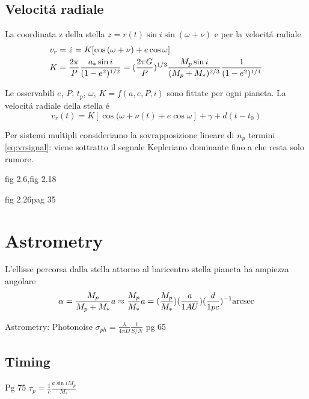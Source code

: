 \subsection{Velocit\'a radiale}
\begin{workout}
La coordinata z della stella $z=r(t)\sin{i}\sin{(\omega+\nu)}$ e per la velocit\'a radiale
\begin{align}
&v_r=\dot{z}=K[\cos{(\omega+\nu)}+e\cos{\omega}]\label{eq:vrsignal}\\
&K=\frac{2\pi}{P}\frac{a_*\sin{i}}{(1-e^2)\expy{1/2}}=(\frac{2\pi G}{P})\expy{1/3}\frac{M_p\sin{i}}{(M_p+M_*)\expy{2/3}}\frac{1}{(1-e^2)\expy{1/1}}
\end{align}

Le osservabili $e$, $P$, $t_p$, $\omega$, $K=f(a,e,P,i)$ sono fittate per ogni pianeta.
La velocit\'a radiale della stella \'e
\begin{equation}
v_r(t)=K[\cos{(\omega+\nu(t)}+e\cos{\omega}]+\gamma+d(t-t_0)
\end{equation}
\end{workout}
Per sistemi multipli consideriamo la sovrapposizione lineare di $n_p$ termini \eqref{eq:vrsignal}: viene sottratto il segnale Kepleriano dominante fino a che resta solo rumore.
\begin{workout}
fig 2.6,fig 2.18
\end{workout}
\begin{workout}
fig 2.26pag 35
\end{workout}
\section{Astrometry}
L'ellisse percorsa dalla stella attorno al baricentro stella pianeta ha ampiezza angolare
\begin{equation}
\alpha=\frac{M_p}{M_p+M_*}a\approx\frac{M_p}{M_*}a=(\frac{M_p}{M_*})(\frac{a}{1AU})(\frac{d}{1pc})\expy{-1}\si{\arcsec}
\end{equation}

\begin{workout}
Astrometry: Photonoise $\sigma_{ph}=\frac{\lambda}{4\pi D}\frac{1}{S/N}$
pg 65
\end{workout}

\subsection{Timing}
\begin{workout}
Pg 75
$\tau_p=\frac{1}{c}\frac{a\sin{i}M_p}{M_*}$
\end{workout}
